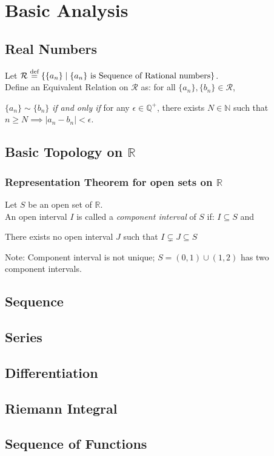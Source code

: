 \chapter{Basic Analysis}

\section{Real Numbers}
\begin{definition}
    Let $\mathcal{R} \overset{\textnormal{def}}{=} \{ \{a_n\} \mid \text{$\{a_n\}$ is Sequence of Rational numbers} \}$. \\
    Define an Equivalent Relation on $\mathcal{R}$ as: for all $\{a_n\}, \{b_n\} \in \mathcal{R}$,
    \begin{center}
        $\{a_n\} \sim \{b_n\}$ \textit{if and only if} for any $\epsilon \in \mathbb{Q}^+$, there exists $N \in \mathbb{N}$ such that $n \geq N \implies |a_n - b_n| < \epsilon$.
    \end{center}
\end{definition}

\section{Basic Topology on $\mathbb{R}$}
\subsection{Representation Theorem for open sets on $\mathbb{R}$}
\begin{definition}
    Let $S$ be an open set of $\mathbb{R}$.\\
    An open interval $I$ is called a \textit{component interval} of $S$ if: $I \subseteq S$ and
    \begin{center}
        There exists no open interval $J$ such that $I \subsetneq J \subseteq S$
    \end{center}
    Note: Component interval is not unique; $S = (0,1) \cup (1,2)$ has two component intervals.
\end{definition}
\begin{lemma}
    
\end{lemma}

\section{Sequence}

\section{Series}

\section{Differentiation}

\section{Riemann Integral}

\section{Sequence of Functions}
